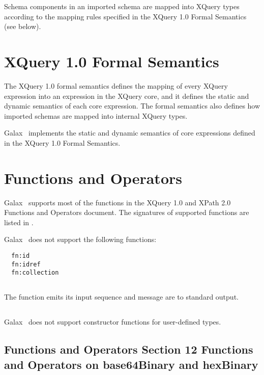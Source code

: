       Schema components in an imported schema are mapped into XQuery 
      types according to the mapping rules specified in the XQuery 1.0
      Formal Semantics (see below).

\section{XQuery 1.0 Formal Semantics}

  The XQuery 1.0 formal semantics defines the mapping of every XQuery
  expression into an expression in the XQuery core, and it defines the
  static and dynamic semantics of each core expression.  The formal
  semantics also defines how imported schemas are mapped into internal
  XQuery types.
  
  Galax \galaxversion\ implements the static and dynamic semantics of core
  expressions defined in the XQuery 1.0 Formal Semantics. 

\section{Functions and Operators}

  Galax \galaxversion\ supports most of the functions in the XQuery 1.0 and
  XPath 2.0 Functions and Operators document.  The signatures of
  supported functions are listed in .

  Galax \galaxversion\ does not support the following functions: 
\begin{verbatim}
  fn:id
  fn:idref
  fn:collection
\end{verbatim}

\subsection*{}

    The  function emits its input sequence and message are to standard output. 

\subsection*{} Galax \galaxversion\ does not support constructor functions
for user-defined types.

\subsection*{Functions and Operators Section 12 Functions and Operators on base64Binary and hexBinary}

